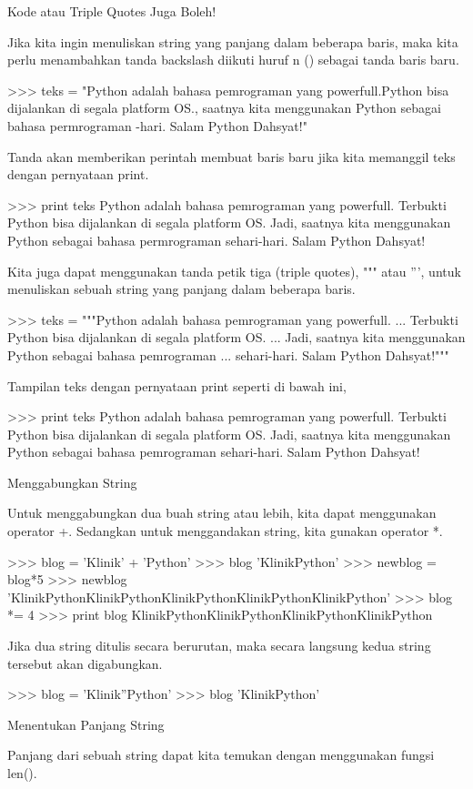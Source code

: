 \begin{enumerate}
Kode \n atau Triple Quotes Juga Boleh!

Jika kita ingin menuliskan string yang panjang dalam beberapa baris, maka kita perlu menambahkan tanda backslash diikuti huruf n (\n) sebagai tanda baris baru.

>>> teks = "Python adalah bahasa pemrograman yang powerfull.\nTerbukti Python bisa dijalankan di segala platform OS.\nJadi, saatnya kita menggunakan Python sebagai bahasa permrograman \nsehari-hari. Salam Python Dahsyat!"

Tanda \n akan memberikan perintah membuat baris baru jika kita memanggil teks dengan pernyataan print.

>>> print teks
Python adalah bahasa pemrograman yang powerfull.
Terbukti Python bisa dijalankan di segala platform OS.
Jadi, saatnya kita menggunakan Python sebagai bahasa permrograman
sehari-hari. Salam Python Dahsyat!

Kita juga dapat menggunakan tanda petik tiga (triple quotes), """ atau ''', untuk menuliskan sebuah string yang panjang dalam beberapa baris.

>>> teks = """Python adalah bahasa pemrograman yang powerfull.
... Terbukti Python bisa dijalankan di segala platform OS.
... Jadi, saatnya kita menggunakan Python sebagai bahasa pemrograman
... sehari-hari. Salam Python Dahsyat!"""

Tampilan teks dengan pernyataan print seperti di bawah ini,

>>> print teks
Python adalah bahasa pemrograman yang powerfull.
Terbukti Python bisa dijalankan di segala platform OS.
Jadi, saatnya kita menggunakan Python sebagai bahasa pemrograman
sehari-hari. Salam Python Dahsyat!

Menggabungkan String

Untuk menggabungkan dua buah string atau lebih, kita dapat menggunakan operator +. Sedangkan untuk menggandakan string, kita gunakan operator *.

>>> blog = 'Klinik' + 'Python'
>>> blog
'KlinikPython'
>>> newblog = blog*5
>>> newblog
'KlinikPythonKlinikPythonKlinikPythonKlinikPythonKlinikPython'
>>> blog *= 4
>>> print blog
KlinikPythonKlinikPythonKlinikPythonKlinikPython

Jika dua string ditulis secara berurutan, maka secara langsung kedua string tersebut akan digabungkan.

>>> blog = 'Klinik''Python'
>>> blog
'KlinikPython'

Menentukan Panjang String

Panjang dari sebuah string dapat kita temukan dengan menggunakan fungsi len().


\end{enumerate}
